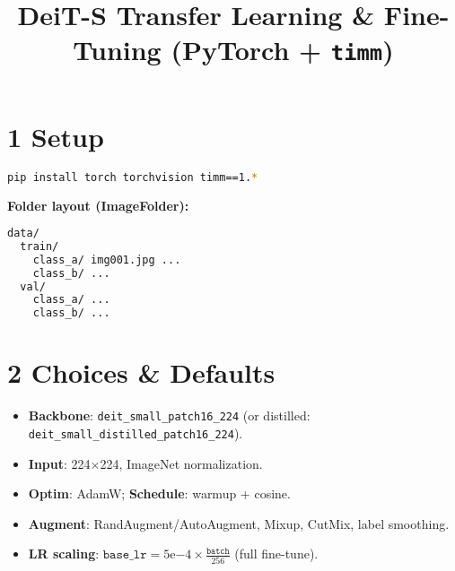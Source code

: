 \documentclass[11pt]{article}
\title{DeiT-S Transfer Learning \& Fine-Tuning (PyTorch + \texttt{timm})}
\author{}
\date{}
\begin{document}
\maketitle

\section*{1 Setup}
\begin{lstlisting}[language=bash,style=code]
pip install torch torchvision timm==1.*
\end{lstlisting}

\noindent\textbf{Folder layout (ImageFolder):}
\begin{lstlisting}[language=bash,style=code]
data/
  train/
    class_a/ img001.jpg ...
    class_b/ ...
  val/
    class_a/ ...
    class_b/ ...
\end{lstlisting}

\section*{2 Choices \& Defaults}
\begin{itemize}[leftmargin=1.3em]
  \item \textbf{Backbone}: \texttt{deit\_small\_patch16\_224} (or distilled: \texttt{deit\_small\_distilled\_patch16\_224}).
  \item \textbf{Input}: 224$\times$224, ImageNet normalization.
  \item \textbf{Optim}: AdamW; \textbf{Schedule}: warmup + cosine.
  \item \textbf{Augment}: RandAugment/AutoAugment, Mixup, CutMix, label smoothing.
  \item \textbf{LR scaling}: $\texttt{base\_lr} = 5\mathrm{e}{-4}\times \frac{\texttt{batch}}{256}$ (full fine-tune).
\end{itemize}
\end{document}
